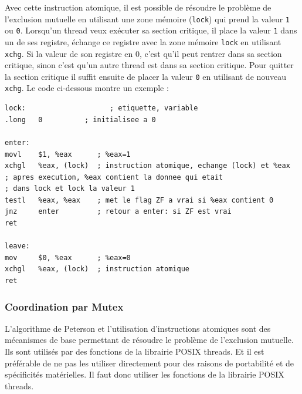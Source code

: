 Avec cette instruction atomique, il est possible de résoudre le problème de l'exclusion mutuelle en  utilisant une zone mémoire (\texttt{lock}) qui prend la valeur \texttt{1} ou \texttt{0}.
Lorsqu'un thread veux exécuter sa section critique, il place la valeur \texttt{1} dans un de ses registre, échange ce registre avec la zone mémoire \texttt{lock} en utilisant \texttt{xchg}.
Si la valeur de son registre en 0, c'est qu'il peut rentrer dans sa section critique, sinon c'est qu'un autre thread est dans sa section critique.
Pour quitter la section critique il suffit ensuite de placer la valeur \texttt{0} en utilisant de nouveau \texttt{xchg}.
Le code ci-dessous montre un exemple :
\begin{lstlisting}[language={[x86masm]Assembler}, emph={\$,\%,(,),movl},emphstyle={\color{blue}\bfseries}]
lock:                    ; etiquette, variable
.long   0          ; initialisee a 0

enter:
movl    $1, %eax      ; %eax=1
xchgl   %eax, (lock)  ; instruction atomique, echange (lock) et %eax
; apres execution, %eax contient la donnee qui etait
; dans lock et lock la valeur 1
testl   %eax, %eax    ; met le flag ZF a vrai si %eax contient 0
jnz     enter         ; retour a enter: si ZF est vrai
ret

leave:
mov     $0, %eax      ; %eax=0
xchgl   %eax, (lock)  ; instruction atomique
ret
\end{lstlisting}

\subsubsection*{Coordination par Mutex}
L'algorithme de Peterson et l'utilisation d'instructions atomiques sont des mécanismes de base permettant de résoudre le problème de l'exclusion mutuelle.
Ils sont utilisés par des fonctions de la librairie POSIX threads.
Et il est préférable de ne pas les utiliser directement pour des raisons de portabilité et de spécificités matérielles.
Il faut donc utiliser les fonctions de la librairie POSIX threads.

